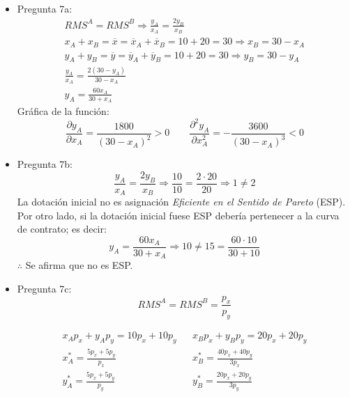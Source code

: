 \begin{itemize}
	\item Pregunta 7a:
			\begin{gather*}
				RMS^{A} = RMS^{B} \Rightarrow \frac{y_A}{x_A}	= \frac{2y_B}{x_B} \\
				x_A + x_B = \overline{x} = \overline{x}_A + \overline{x}_B = 10 + 20 = 30 \Rightarrow x_B = 30 - x_A\\
				y_A + y_B = \overline{y} = \overline{y}_A + \overline{y}_B = 10 + 20 = 30 \Rightarrow y_B = 30 - y_A\\
				\frac{y_A}{x_A}	= \frac{2\left(30 - y_A \right) }{30 -x_A}\\
				y_A = \frac{60x_A}{30+x_A}
			\end{gather*}
			Gráfica de la función:
				$$ \frac{\partial y_A}{\partial x_A} = \frac{1800}{\left( 30 - x_A\right)^2 } > 0 \qquad \frac{\partial^2 y_A}{\partial x_{A}^{2}} = - \frac{3600}{(30-x_A)^3} < 0$$
				
				\begin{center}
				\end{center}
	\item Pregunta 7b:
				$$\frac{y_A}{x_A}	= \frac{2y_B}{x_B} \Longrightarrow \frac{10}{10} = \frac{2 \cdot 20}{20} \Longrightarrow 1 \neq 2$$
			La dotación inicial  no es asignación \emph{Eficiente en el Sentido de Pareto} (ESP). Por otro lado, si la dotación inicial fuese ESP debería pertenecer a la curva de contrato; es decir:
				$$y_A = \frac{60x_A}{30+x_A} \Longrightarrow 10 \neq 15 = \frac{60 \cdot 10}{30 +10}$$
			$\therefore$ Se afirma que no es ESP.
	\item Pregunta 7c:
				$$RMS^{A} = RMS^{B} = \frac{p_x}{p_y}$$
				
				$$\begin{array}{ccc}
					x_Ap_x + y_Ap_y	= 10p_x + 10p_y & {} & x_Bp_x + y_Bp_y	= 20p_x + 20p_y   \\[.5cm]
					x_{A}^{*}=\frac{5p_x+5p_y}{p_x} & {} & x_{B}^{*}=\frac{40p_x+40p_y}{3p_x} \\[.5cm]
					y_{A}^{*}=\frac{5p_x+5p_y}{p_y} & {} & y_{B}^{*}=\frac{20p_x+20p_y}{3p_y}
				\end{array}$$
			

\end{itemize}
